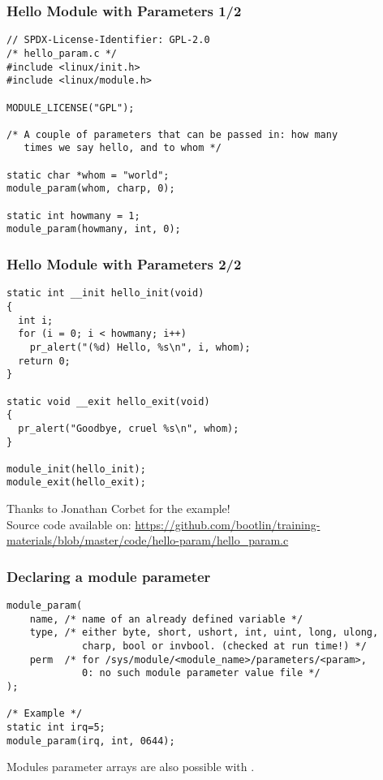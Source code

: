 \begin{frame}[fragile]
  \frametitle{Hello Module with Parameters 1/2}
\begin{verbatim}
// SPDX-License-Identifier: GPL-2.0
/* hello_param.c */
#include <linux/init.h>
#include <linux/module.h>

MODULE_LICENSE("GPL");

/* A couple of parameters that can be passed in: how many
   times we say hello, and to whom */

static char *whom = "world";
module_param(whom, charp, 0);

static int howmany = 1;
module_param(howmany, int, 0);

\end{verbatim}
\end{frame}

\begin{frame}[fragile]
  \frametitle{Hello Module with Parameters 2/2}
\begin{verbatim}
static int __init hello_init(void)
{
  int i;
  for (i = 0; i < howmany; i++)
    pr_alert("(%d) Hello, %s\n", i, whom);
  return 0;
}

static void __exit hello_exit(void)
{
  pr_alert("Goodbye, cruel %s\n", whom);
}

module_init(hello_init);
module_exit(hello_exit);
\end{verbatim}
Thanks to Jonathan Corbet for the example!\\
Source code available on: {\small
\url{https://github.com/bootlin/training-materials/blob/master/code/hello-param/hello_param.c}}
\end{frame}

\begin{frame}[fragile]
  \frametitle{Declaring a module parameter}

\begin{verbatim}
module_param(
    name, /* name of an already defined variable */
    type, /* either byte, short, ushort, int, uint, long, ulong,
             charp, bool or invbool. (checked at run time!) */
    perm  /* for /sys/module/<module_name>/parameters/<param>,
             0: no such module parameter value file */
);

/* Example */
static int irq=5;
module_param(irq, int, 0644);
\end{verbatim}
Modules parameter arrays are also possible with
.
\end{frame}
